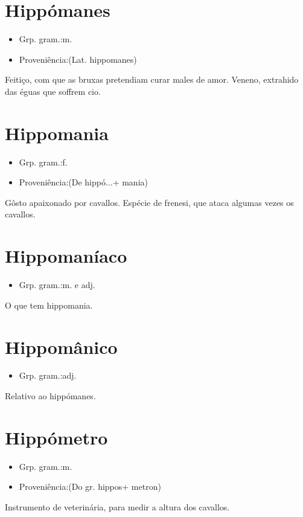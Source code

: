 \documentclass{article}
\begin{document}
\section{Hippómanes}
\begin{itemize}
\item {Grp. gram.:m.}
\end{itemize}
\begin{itemize}
\item {Proveniência:(Lat. \textunderscore hippomanes\textunderscore )}
\end{itemize}
Feitiço, com que as bruxas pretendiam curar males de amor.
Veneno, extrahido das éguas que soffrem cio.
\section{Hippomania}
\begin{itemize}
\item {Grp. gram.:f.}
\end{itemize}
\begin{itemize}
\item {Proveniência:(De \textunderscore hippó...\textunderscore  + \textunderscore mania\textunderscore )}
\end{itemize}
Gôsto apaixonado por cavallos.
Espécie de frenesi, que ataca algumas vezes os cavallos.
\section{Hippomaníaco}
\begin{itemize}
\item {Grp. gram.:m.  e  adj.}
\end{itemize}
O que tem hippomania.
\section{Hippomânico}
\begin{itemize}
\item {Grp. gram.:adj.}
\end{itemize}
Relativo ao hippómanes.
\section{Hippómetro}
\begin{itemize}
\item {Grp. gram.:m.}
\end{itemize}
\begin{itemize}
\item {Proveniência:(Do gr. \textunderscore hippos\textunderscore  + \textunderscore metron\textunderscore )}
\end{itemize}
Instrumento de veterinária, para medir a altura dos cavallos.
\end{document}

